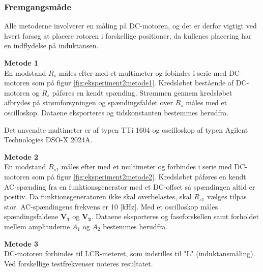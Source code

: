 \subsubsection{Fremgangsmåde}
Alle metoderne involverer en måling på DC-motoren, og det er derfor vigtigt ved hvert forsøg at placere
rotoren i forskellige positioner, da kullenes placering har en indflydelse på induktansen.

\textbf{Metode 1}\\
En modstand \(R_s\) måles efter med et multimeter og fobindes i serie med DC-motoren
som på figur \ref{fig:eksperiment2metode1}.
Kredsløbet bestående af DC-motoren og \(R_s\) påføres en kendt spænding.
Strømmen gennem kredsløbet afbrydes på strømforsyningen og spændingsfaldet
over \(R_s\) måles med et oscilloskop.
Dataene eksporteres og tidskonstanten bestemmes herudfra.

Det anvendte multimeter er af typen TTi 1604 og oscilloskop af typen Agilent Technologies DSO-X 2024A.

\textbf{Metode 2}\\
En modstand \(R_{s1}\) måles efter med et multimeter og forbindes i serie med DC-motoren
som på figur \ref{fig:eksperiment2metode2}.
Kredsløbet påføres en kendt AC-spænding fra en funktionsgenerator med et DC-offset så spændingen
altid er positiv.
Da funktionsgeneratoren ikke skal overbelastes, skal \(R_{s1}\) vælges tilpas stor.
AC-spændingens frekvens er 10 [kHz].
Med et oscilloskop måles spændingsfaldene \(\mathbf{V_1}\) og \(\mathbf{V_2}\).
Dataene eksporteres og faseforskellen samt forholdet mellem amplituderne \(A_1\) og \(A_2\) bestemmes herudfra.

\textbf{Metode 3}\\
DC-motoren forbindes til LCR-meteret, som indstilles til "L" (induktansmåling).
Ved forskellige testfrekvenser noteres resultatet.

